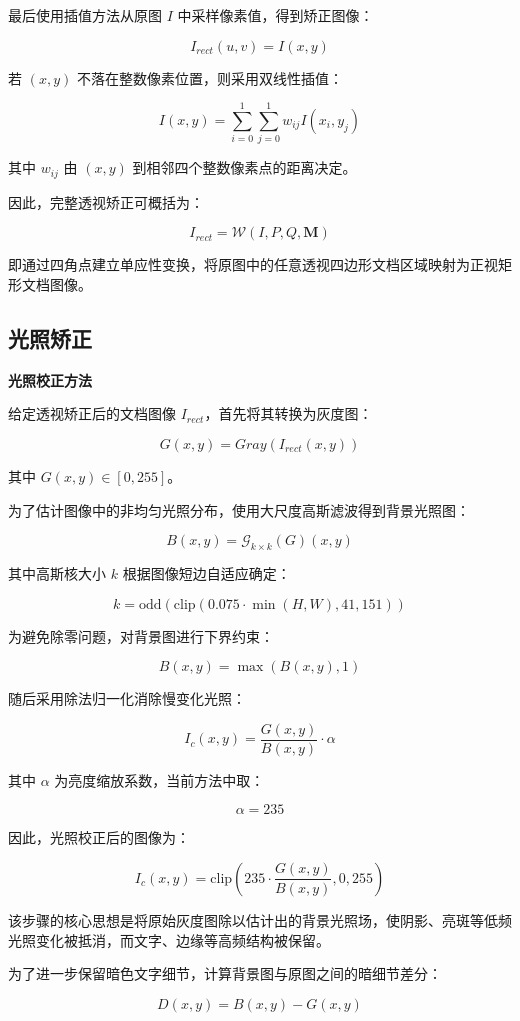 \documentclass[letterpaper]{article}
\begin{document}
最后使用插值方法从原图 \(I\) 中采样像素值，得到矫正图像：

\[
I_{rect}(u,v)=I(x,y)
\]

若 \((x,y)\) 不落在整数像素位置，则采用双线性插值：

\[
I(x,y)=
\sum_{i=0}^{1}\sum_{j=0}^{1}
w_{ij} I(x_i,y_j)
\]

其中 \(w_{ij}\) 由 \((x,y)\) 到相邻四个整数像素点的距离决定。

因此，完整透视矫正可概括为：

\[
I_{rect}=\mathcal{W}(I,P,Q,\mathbf{M})
\]

即通过四角点建立单应性变换，将原图中的任意透视四边形文档区域映射为正视矩形文档图像。

\subsection{光照矫正}

\textbf{光照校正方法}

给定透视矫正后的文档图像 \(I_{rect}\)，首先将其转换为灰度图：

\[
G(x,y)=Gray(I_{rect}(x,y))
\]

其中 \(G(x,y)\in[0,255]\)。

为了估计图像中的非均匀光照分布，使用大尺度高斯滤波得到背景光照图：

\[
B(x,y)=\mathcal{G}_{k\times k}(G)(x,y)
\]

其中高斯核大小 \(k\) 根据图像短边自适应确定：

\[
k=\mathrm{odd}\left(\mathrm{clip}(0.075\cdot \min(H,W),41,151)\right)
\]

为避免除零问题，对背景图进行下界约束：

\[
B(x,y)=\max(B(x,y),1)
\]

随后采用除法归一化消除慢变化光照：

\[
I_{c}(x,y)=\frac{G(x,y)}{B(x,y)}\cdot \alpha
\]

其中 \(\alpha\) 为亮度缩放系数，当前方法中取：

\[
\alpha=235
\]

因此，光照校正后的图像为：

\[
I_c(x,y)=\mathrm{clip}\left(235\cdot \frac{G(x,y)}{B(x,y)},0,255\right)
\]

该步骤的核心思想是将原始灰度图除以估计出的背景光照场，使阴影、亮斑等低频光照变化被抵消，而文字、边缘等高频结构被保留。

为了进一步保留暗色文字细节，计算背景图与原图之间的暗细节差分：

\[
D(x,y)=B(x,y)-G(x,y)
\]
\end{document}
